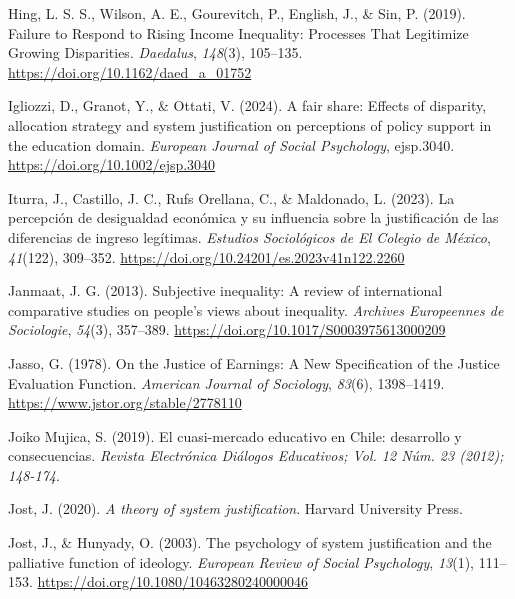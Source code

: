 \documentclass[
  12pt,
  a4paper,
]{article}
\newlength{\cslhangindent}
\newenvironment{CSLReferences}[2] %
 {%
  \setlength{\parindent}{0pt}
  \ifodd #1 \everypar{\setlength{\hangindent}{\cslhangindent}}\ignorespaces\fi
  \ifnum #2 > 0
  \setlength{\parskip}{#2\baselineskip}
  \fi
 }%
 {}
\begin{document}
\begin{CSLReferences}{1}{0}
Hing, L. S. S., Wilson, A. E., Gourevitch, P., English, J., \& Sin, P. (2019). Failure to {Respond} to {Rising Income Inequality}: {Processes That Legitimize Growing Disparities}. \emph{Daedalus}, \emph{148}(3), 105--135. \url{https://doi.org/10.1162/daed_a_01752}

Igliozzi, D., Granot, Y., \& Ottati, V. (2024). A fair share: {Effects} of disparity, allocation strategy and system justification on perceptions of policy support in the education domain. \emph{European Journal of Social Psychology}, ejsp.3040. \url{https://doi.org/10.1002/ejsp.3040}

Iturra, J., Castillo, J. C., Rufs Orellana, C., \& Maldonado, L. (2023). La percepci{ó}n de desigualdad econ{ó}mica y su influencia sobre la justificaci{ó}n de las diferencias de ingreso leg{í}timas. \emph{Estudios Sociol{ó}gicos de El Colegio de M{é}xico}, \emph{41}(122), 309--352. \url{https://doi.org/10.24201/es.2023v41n122.2260}

Janmaat, J. G. (2013). Subjective inequality: {A} review of international comparative studies on people's views about inequality. \emph{Archives Europeennes de Sociologie}, \emph{54}(3), 357--389. \url{https://doi.org/10.1017/S0003975613000209}

Jasso, G. (1978). On the {Justice} of {Earnings}: {A New Specification} of the {Justice Evaluation Function}. \emph{American Journal of Sociology}, \emph{83}(6), 1398--1419. \url{https://www.jstor.org/stable/2778110}

Joiko Mujica, S. (2019). {El cuasi-mercado educativo en Chile: desarrollo y consecuencias}. \emph{Revista Electr{ó}nica Di{á}logos Educativos; Vol. 12 N{ú}m. 23 (2012); 148-174}.

Jost, J. (2020). \emph{A theory of system justification}. Harvard University Press.

Jost, J., \& Hunyady, O. (2003). The psychology of system justification and the palliative function of ideology. \emph{European Review of Social Psychology}, \emph{13}(1), 111--153. \url{https://doi.org/10.1080/10463280240000046}


\end{CSLReferences}
\end{document}

